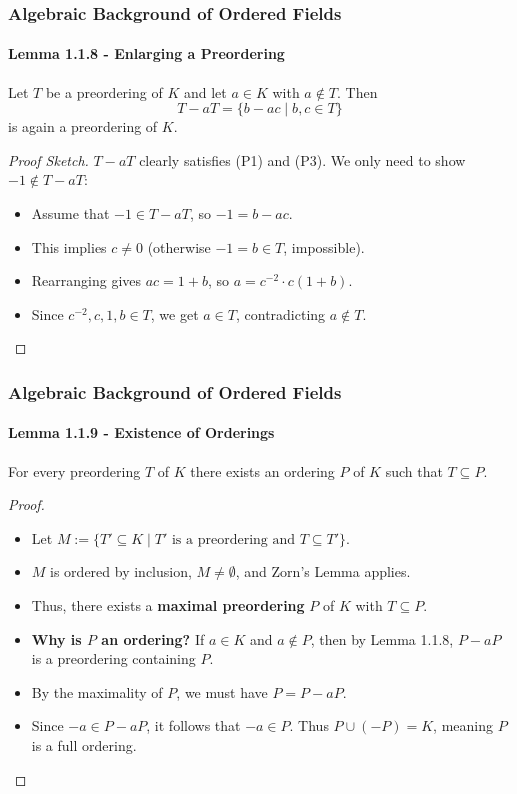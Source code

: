 \documentclass[11pt]{beamer}
\begin{document}
\begin{frame}
    \frametitle{Algebraic Background of Ordered Fields}
    \framesubtitle{Lemma 1.1.8 - Enlarging a Preordering}

    \begin{lemma}[Lemma 1.1.8]
        Let $T$ be a preordering of $K$ and let $a \in K$ with $a \notin T$. Then
        \[ T - aT = \{b - ac \mid b, c \in T\} \]
        is again a preordering of $K$.
    \end{lemma}

    \begin{proof}[Proof Sketch]
        $T - aT$ clearly satisfies (P1) and (P3). We only need to show $-1 \notin T - aT$:
        \begin{itemize}
            \item Assume that $-1 \in T - aT$, so $-1 = b - ac$.
            \item This implies $c \neq 0$ (otherwise $-1 = b \in T$, impossible).
            \item Rearranging gives $ac = 1 + b$, so $a = c^{-2} \cdot c(1 + b)$.
            \item Since $c^{-2}, c, 1, b \in T$, we get $a \in T$, contradicting $a \notin T$. \qedhere
        \end{itemize}
    \end{proof}
\end{frame}

\begin{frame}
    \frametitle{Algebraic Background of Ordered Fields}
    \framesubtitle{Lemma 1.1.9 - Existence of Orderings}

    \begin{lemma}[Lemma 1.1.9]
        For every preordering $T$ of $K$ there exists an ordering $P$ of $K$ such that $T \subseteq P$.
    \end{lemma}

    \begin{proof}
        \begin{itemize}
            \setlength{\itemsep}{0.4em}
            \item Let $M := \{T' \subseteq K \mid T' \text{ is a preordering and } T \subseteq T'\}$.
            \item $M$ is ordered by inclusion, $M \neq \emptyset$, and Zorn's Lemma applies.
            \item Thus, there exists a \textbf{maximal preordering} $P$ of $K$ with $T \subseteq P$.
            \item \textbf{Why is $P$ an ordering?} If $a \in K$ and $a \notin P$, then by Lemma 1.1.8, $P - aP$ is a preordering containing $P$.
            \item By the maximality of $P$, we must have $P = P - aP$.
            \item Since $-a \in P - aP$, it follows that $-a \in P$. Thus $P \cup (-P) = K$, meaning $P$ is a full ordering. \qedhere
        \end{itemize}
    \end{proof}
\end{frame}
\end{document}
